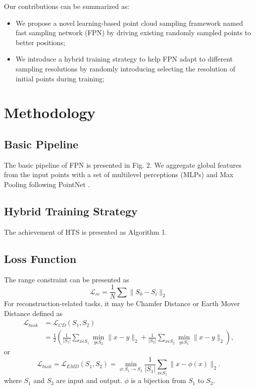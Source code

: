 \documentclass[a4paper,10pt]{article}
\begin{document}
\begin{multicols}{2}
Our contributions can be summarized as:
\begin{itemize}
 \item We propose a novel learning-based point cloud sampling framework named fast sampling network (FPN) by driving existing randomly sampled points to better positions;
 \item We introduce a hybrid training strategy to help FPN adapt to different sampling resolutions by randomly introducing selecting the resolution of initial points during training;
\end{itemize}


\section{Methodology}
\subsection{Basic Pipeline}
The basic pipeline of FPN is presented in Fig. 2. We aggregate global features from the input points with a set of multilevel perceptions (MLPs) and Max Pooling following PointNet \cite{qi2017pointnet}.

\subsection{Hybrid Training Strategy}
The achievement of HTS is presented as Algorithm 1.

\subsection{Loss Function}
The range constraint can be presented as
\begin{equation}
 \mathcal{L}_{rc} = \frac{1}{N}\sum \|S_0 - S_i\|_2
\end{equation}
For reconstruction-related tasks, it may be Chamfer Distance or Earth Mover Distance \cite{fan2017point} deﬁned as
\begin{equation} \label{eqn:eqn1}
\begin{split}
\mathcal{L}_{task} & = \mathcal{L}_{CD}(S_1, S_2) \\
& = \frac{1}{2} \left (\frac{1}{|S_1|}\sum_{x \epsilon S_1}\min_{y \epsilon S_2} \|x-y\|_2 + \frac{1}{|S_2|}\sum_{x \epsilon S_2}\min_{y \epsilon S_1} \|x-y\|_2 \right ),
\end{split}
\end{equation}
or
\begin{equation}
 \mathcal{L}_{task} = \mathcal{L}_{EMD}(S_1, S_2) = \min_{\phi : S_1 \rightarrow S_2} \frac{1}{|S_1|}\sum_{x \epsilon S_1} \|x-\phi(x) \|_2.
\end{equation}
where $S_1$ and $S_2$ are input and output. $\phi$ is a bijection from $S_1$ to $S_2$.


\end{multicols}
\end{document}
